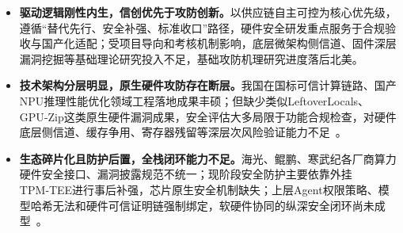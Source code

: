 \begin{itemize}[tabitem]
\item \textbf{驱动逻辑刚性内生，信创优先于攻防创新。}以供应链自主可控为核心优先级，遵循“替代先行、安全补强、标准收口”路径，硬件安全研发重点服务于合规验收与国产化适配；受项目导向和考核机制影响，底层微架构侧信道、固件深层漏洞挖掘等基础理论研究投入不足，基础攻防机理研究进度落后北美。
\item \textbf{技术架构分层明显，原生硬件攻防存在断层。}我国在国标可信计算链路、国产NPU推理性能优化领域工程落地成果丰硕；但缺少类似LeftoverLocals、GPU‑Zip这类原生硬件漏洞成果，安全评估大多局限于功能合规检查，对硬件底层侧信道、缓存争用、寄存器残留等深层次风险验证能力不足~\cite{openpanguquant2026,w4a16ascend2026}。
\item \textbf{生态碎片化且防护后置，全栈闭环能力不足。}海光、鲲鹏、寒武纪各厂商算力硬件安全接口、漏洞披露规范不统一；现阶段安全防护主要依靠外挂TPM‑TEE进行事后补强，芯片原生安全机制缺失；上层Agent权限策略、模型哈希无法和硬件可信证明链强制绑定，软硬件协同的纵深安全闭环尚未成型~\cite{openeuler2026}。
\end{itemize}

\begingroup

